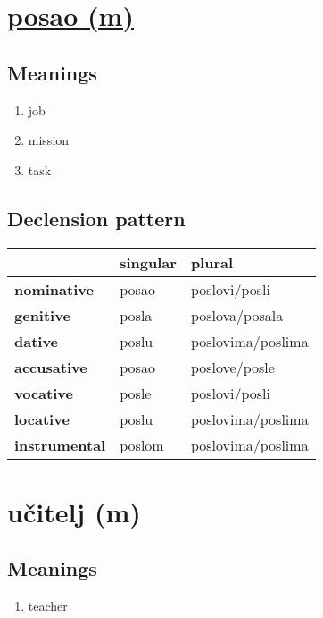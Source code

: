 \filbreak
\section{\underline{posao (m)}}
\subsection*{Meanings}
\begin{enumerate}
\item job
\item mission
\item task
\end{enumerate}
\subsection*{Declension pattern}
\begin{tabularx}{\linewidth}{Xll}
\toprule
{} & singular &             plural \\
\midrule
\textbf{nominative  } &    posao &      poslovi/posli \\
\textbf{genitive    } &    posla &     poslova/posala \\
\textbf{dative      } &    poslu &  poslovima/poslima \\
\textbf{accusative  } &    posao &      poslove/posle \\
\textbf{vocative    } &    posle &      poslovi/posli \\
\textbf{locative    } &    poslu &  poslovima/poslima \\
\textbf{instrumental} &   poslom &  poslovima/poslima \\
\bottomrule
\end{tabularx}

\filbreak
\section{učitelj (m)}
\subsection*{Meanings}
\begin{enumerate}
\item teacher
\end{enumerate}
